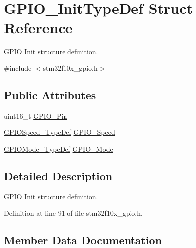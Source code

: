 \hypertarget{struct_g_p_i_o___init_type_def}{}\section{G\+P\+I\+O\+\_\+\+Init\+Type\+Def Struct Reference}
\label{struct_g_p_i_o___init_type_def}


G\+P\+IO Init structure definition.  




{\ttfamily \#include $<$stm32f10x\+\_\+gpio.\+h$>$}

\subsection*{Public Attributes}
\begin{DoxyCompactItemize}
\item 
uint16\+\_\+t \hyperlink{struct_g_p_i_o___init_type_def_a35fc26fc58226126c5b99478a472e5e9}{G\+P\+I\+O\+\_\+\+Pin}
\item 
\hyperlink{group___g_p_i_o___exported___types_ga062ad92b67b4a1f301c161022cf3ba8e}{G\+P\+I\+O\+Speed\+\_\+\+Type\+Def} \hyperlink{struct_g_p_i_o___init_type_def_ac05832cacebc861a9acf5294d702c16b}{G\+P\+I\+O\+\_\+\+Speed}
\item 
\hyperlink{group___g_p_i_o___exported___types_ga1347339e1c84a196fabbb31205eec5d4}{G\+P\+I\+O\+Mode\+\_\+\+Type\+Def} \hyperlink{struct_g_p_i_o___init_type_def_a55bd77e335c2bfeec9caa5dc922b791b}{G\+P\+I\+O\+\_\+\+Mode}
\end{DoxyCompactItemize}


\subsection{Detailed Description}
G\+P\+IO Init structure definition. 

Definition at line 91 of file stm32f10x\+\_\+gpio.\+h.



\subsection{Member Data Documentation}
\mbox{\label{struct_g_p_i_o___init_type_def_a55bd77e335c2bfeec9caa5dc922b791b}} 
